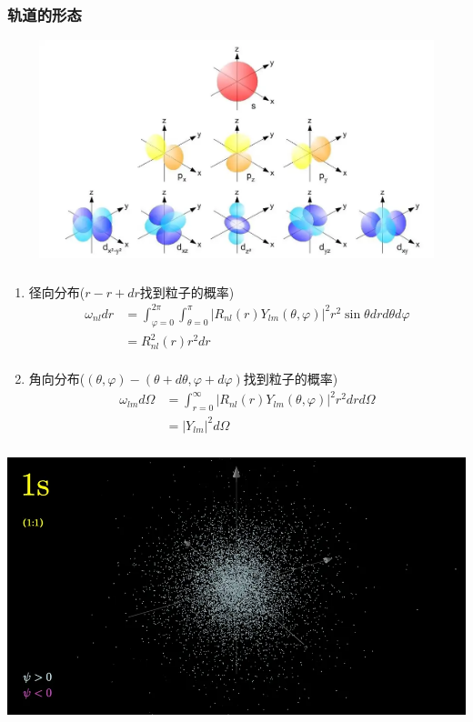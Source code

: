 \begin{frame}
	  \frametitle{轨道的形态}
		\begin{center}
			 \includegraphics[width=1.0\textwidth,height=2.5in]{figs/2022-03-25-19-35-50.png}
		\end{center}	 
\end{frame}	

\begin{frame}
	  \frametitle{}
	  \例 [求电子云的形态]{}
	  \begin{enumerate}
		  \item 径向分布($r-r+dr$找到粒子的概率)
		   \[ \begin{aligned}
	    \omega_{nl} dr &= \int _{\varphi=0} ^{2\pi} \int _{\theta=0} ^{\pi} |R_{nl}(r)Y_{lm}(\theta,\varphi)|^2 r^2\sin \theta dr d\theta d \varphi \\
		&= R^2_{nl}(r) r^2 dr \\
		\end{aligned}\]
		\item 角向分布($(\theta,\varphi)-(\theta+d\theta,\varphi+d\varphi)$找到粒子的概率)		
		\[ \begin{aligned}
			\omega_{lm} d \Omega &= \int _{r=0} ^{\infty} |R_{nl}(r)Y_{lm}(\theta,\varphi)|^2 r^2dr  d \Omega \\
			&= |Y_{lm}|^2 d \Omega 	
			\end{aligned}\]		
	  \end{enumerate}  
\end{frame}
\begin{frame}
	\frametitle{}
  \begin{center}
	   \includegraphics[width=1\textwidth]{figs/2022-03-30-18-45-45.png}
  \end{center}
\end{frame}

